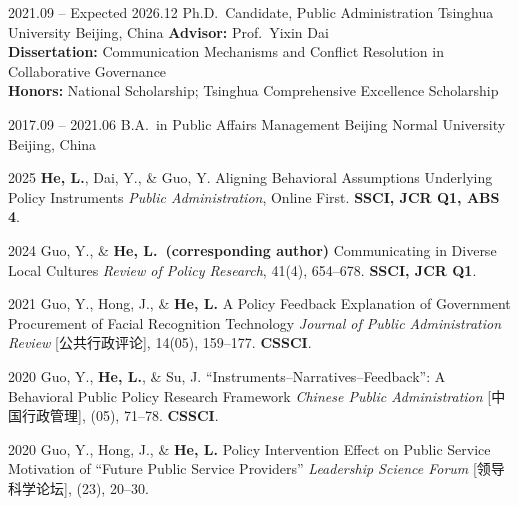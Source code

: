 \documentclass[11pt, a4paper]{awesome-cv}
\begin{document}
\cventry
  {2021.09 -- Expected 2026.12}
  {Ph.D.\ Candidate, Public Administration}
  {Tsinghua University}
  {Beijing, China}
  {}
  {
    \textbf{Advisor:} Prof.\ Yixin Dai\\
    \textbf{Dissertation:} Communication Mechanisms and Conflict Resolution in Collaborative Governance\\
    \textbf{Honors:} National Scholarship; Tsinghua Comprehensive Excellence Scholarship
  }

\cventry
  {2017.09 -- 2021.06}
  {B.A.\ in Public Affairs Management}
  {Beijing Normal University}
  {Beijing, China}
  {}
  {}




\cventry
  {2025}
  {\textbf{He, L.}, Dai, Y., \& Guo, Y.}
  {Aligning Behavioral Assumptions Underlying Policy Instruments}
  {\textit{Public Administration}, Online First. \textbf{SSCI, JCR Q1, ABS 4}.}
  {}
  {}

\cventry
  {2024}
  {Guo, Y., \& \textbf{He, L.\ (corresponding author)}}
  {Communicating in Diverse Local Cultures}
  {\textit{Review of Policy Research}, 41(4), 654--678. \textbf{SSCI, JCR Q1}.}
  {}
  {}


\cventry
  {2021}
  {Guo, Y., Hong, J., \& \textbf{He, L.}}
  {A Policy Feedback Explanation of Government Procurement of Facial Recognition Technology}
  {\textit{Journal of Public Administration Review} [公共行政评论], 14(05), 159--177. \textbf{CSSCI}.}
  {}
  {}

\cventry
  {2020}
  {Guo, Y., \textbf{He, L.}, \& Su, J.}
  {``Instruments--Narratives--Feedback'': A Behavioral Public Policy Research Framework}
  {\textit{Chinese Public Administration} [中国行政管理], (05), 71--78. \textbf{CSSCI}.}
  {}
  {}

\cventry
  {2020}
  {Guo, Y., Hong, J., \& \textbf{He, L.}}
  {Policy Intervention Effect on Public Service Motivation of ``Future Public Service Providers''}
  {\textit{Leadership Science Forum} [领导科学论坛], (23), 20--30.}
  {}
  {}


\end{document}
